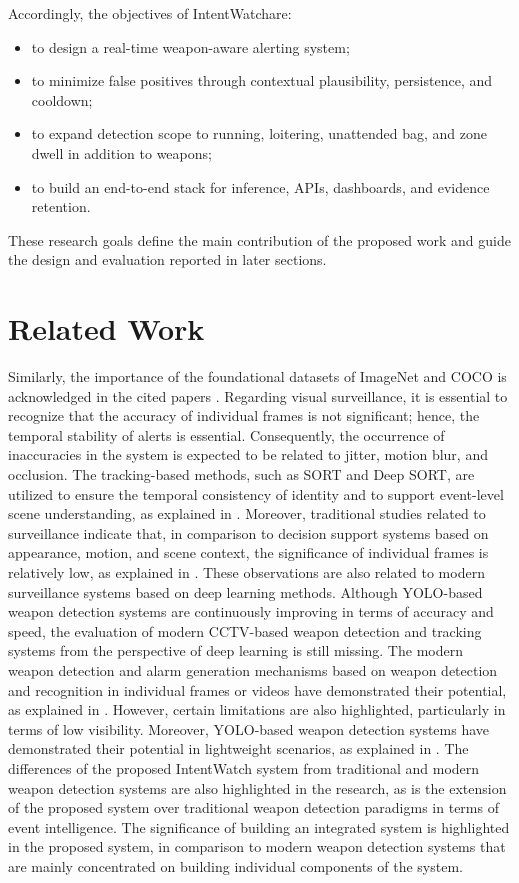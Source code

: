 \documentclass[conference]{IEEEtran}
\newcommand{\IntentWatch}{IntentWatch}
\begin{document}
Accordingly, the objectives of \IntentWatch are:
\begin{itemize}
\item to design a real-time weapon-aware alerting system;
\item to minimize false positives through contextual plausibility, persistence, and cooldown;
\item to expand detection scope to running, loitering, unattended bag, and zone dwell in addition to weapons;
\item to build an end-to-end stack for inference, APIs, dashboards, and evidence retention.
\end{itemize}

These research goals define the main contribution of the proposed work and guide the design and evaluation reported in later sections.


\section{Related Work}
Similarly, the importance of the foundational datasets of ImageNet and COCO is acknowledged in the cited papers \cite{imagenet,coco}. Regarding visual surveillance, it is essential to recognize that the accuracy of individual frames is not significant; hence, the temporal stability of alerts is essential. Consequently, the occurrence of inaccuracies in the system is expected to be related to jitter, motion blur, and occlusion. The tracking-based methods, such as SORT and Deep SORT, are utilized to ensure the temporal consistency of identity and to support event-level scene understanding, as explained in \cite{sort,deepsort}. Moreover, traditional studies related to surveillance indicate that, in comparison to decision support systems based on appearance, motion, and scene context, the significance of individual frames is relatively low, as explained in \cite{surveysurveillance,backgroundmodeling}. These observations are also related to modern surveillance systems based on deep learning methods. Although YOLO-based weapon detection systems are continuously improving in terms of accuracy and speed, the evaluation of modern CCTV-based weapon detection and tracking systems from the perspective of deep learning is still missing. The modern weapon detection and alarm generation mechanisms based on weapon detection and recognition in individual frames or videos have demonstrated their potential, as explained in \cite{olmos2018,grega2016}. However, certain limitations are also highlighted, particularly in terms of low visibility. Moreover, YOLO-based weapon detection systems have demonstrated their potential in lightweight scenarios, as explained in \cite{taddeo2024}. The differences of the proposed \IntentWatch{} system from traditional and modern weapon detection systems are also highlighted in the research, as is the extension of the proposed system over traditional weapon detection paradigms in terms of event intelligence. The significance of building an integrated system is highlighted in the proposed system, in comparison to modern weapon detection systems that are mainly concentrated on building individual components of the system.
\end{document}
